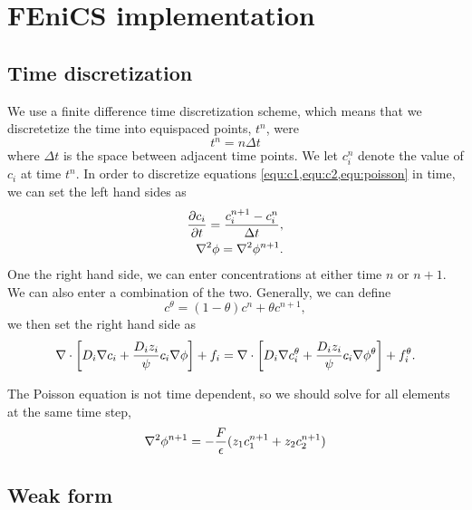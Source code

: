 \documentclass[12pt]{article}
\begin{document}
\section{FEniCS implementation}


\subsection{Time discretization}
We use a finite difference time discretization scheme, which means that we discretetize the time into equispaced points, $t^n$, were 
\begin{equation}
t^n = n\Delta t
\end{equation}
where $\Delta t$ is the space between adjacent time points. We let $c_i^n$ denote the value of $c_i$ at time $t^n$. In order to discretize equations \cref{equ:c1,equ:c2,equ:poisson} in time, we can set the left hand sides as 
\begin{align}
{\partial c_i \over \partial t} = {c_i^{n+1} - c_i^n \over \Delta t}, \\
\nabla^2 \phi = \nabla^2 \phi^{n+1}.
\end{align}
One the right hand side, we can enter concentrations at either time $n$ or $n+1$. We can also enter a combination of the two. Generally, we can define
\begin{equation}
c^\theta = (1-\theta)c^n + \theta c^{n+1},
\end{equation}
we then set the right hand side as 
\begin{equation}
\nabla \cdot \left[ D_i\nabla c_i + {D_iz_i \over \psi} c_i \nabla \phi \right] + f_i = \nabla \cdot \left[ D_i\nabla c_i^\theta + {D_iz_i \over \psi} c_i \nabla \phi^\theta \right] + f_i^\theta.
\end{equation}

The Poisson equation is not time dependent, so we should solve for all elements at the same time step, 
\begin{equation}
\nabla^2 \phi^{n+1} = -{F \over \epsilon} (z_1c_1^{n+1} + z_2c_2^{n+1})
\end{equation}



\subsection{Weak form}
\end{document}
